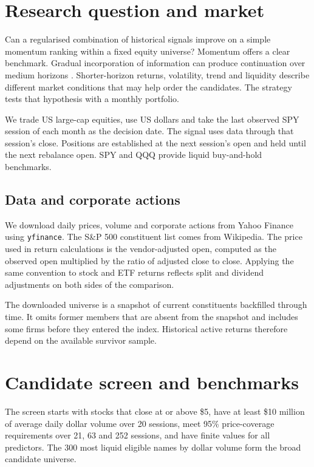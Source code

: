 \documentclass[11pt,a4paper]{article}
\begin{document}
\tableofcontents
\clearpage

\section{Research question and market}
\label{sec:market}
Can a regularised combination of historical signals improve on a simple momentum ranking within a fixed equity universe? Momentum offers a clear benchmark. Gradual incorporation of information can produce continuation over medium horizons \citep{jegadeesh1993}. Shorter-horizon returns, volatility, trend and liquidity describe different market conditions that may help order the candidates. The strategy tests that hypothesis with a monthly portfolio.

We trade US large-cap equities, use US dollars and take the last observed SPY session of each month as the decision date. The signal uses data through that session's close. Positions are established at the next session's open and held until the next rebalance open. SPY and QQQ provide liquid buy-and-hold benchmarks.

\subsection{Data and corporate actions}
We download daily prices, volume and corporate actions from Yahoo Finance using \texttt{yfinance}. The S\&P 500 constituent list comes from Wikipedia. The price used in return calculations is the vendor-adjusted open, computed as the observed open multiplied by the ratio of adjusted close to close. Applying the same convention to stock and ETF returns reflects split and dividend adjustments on both sides of the comparison.

The downloaded universe is a snapshot of current constituents backfilled through time. It omits former members that are absent from the snapshot and includes some firms before they entered the index. Historical active returns therefore depend on the available survivor sample.

\clearpage
\section{Candidate screen and benchmarks}
The screen starts with stocks that close at or above \$5, have at least \$10 million of average daily dollar volume over 20 sessions, meet 95\% price-coverage requirements over 21, 63 and 252 sessions, and have finite values for all predictors. The 300 most liquid eligible names by dollar volume form the broad candidate universe.
\end{document}

